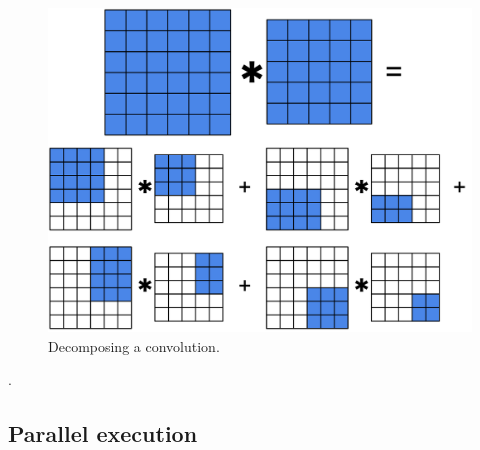   \begin{figure}
    \begin{center}
      \includegraphics[width=0.67\linewidth]{fig/decomposition}
    \end{center}
    \caption{Decomposing a convolution.}
    \label{fig:conv-decomposition}
  \end{figure}



  .




  \subsection{Parallel execution}
